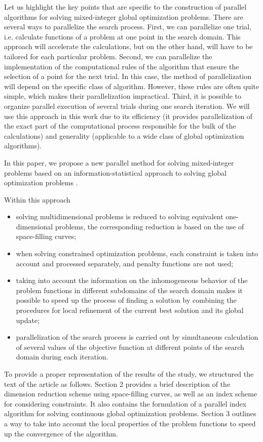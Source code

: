 \documentclass[
11pt,%
tightenlines,%
twoside,%
onecolumn,%
nofloats,%
nobibnotes,%
nofootinbib,%
superscriptaddress,%
noshowpacs,%
centertags]%
{revtex4}
\begin{document}
Let us highlight the key points that are specific to the construction of parallel algorithms for solving mixed-integer global optimization problems. There are several ways to parallelize the search process.
First, we can parallelize one trial, i.e. calculate functions of a problem at one point in the search domain. This approach will accelerate the calculations, but on the other hand, will have to be tailored for each particular problem.
Second, we can parallelize the implementation of the computational rules of the algorithm that ensure the selection of a point for the next trial. In this case, the method of parallelization will depend on the specific class of algorithm. However, these rules are often quite simple, which makes their parallelization impractical.
Third, it is possible to organize parallel execution of several trials during one search iteration. We will use this approach in this work due to its efficiency (it provides parallelization of the exact part of the computational process responsible for the bulk of the calculations) and generality (applicable to a wide class of global optimization algorithms).

In this paper, we propose a new parallel method for solving mixed-integer problems based on an information-statistical approach to solving global optimization problems \cite{Strongin2000,Strongin2013}. 

Within this approach 
\begin{itemize}
	\item 
	solving multidimensional problems is reduced to solving equivalent one-dimensional problems, the corresponding reduction is based on the use of space-filling curves;
	\item 
	when solving constrained optimization problems, each constraint is taken into account and processed separately, and penalty functions are not used;
	\item
	taking into account the information on the inhomogeneous behavior of the problem functions in different subdomains of the search domain makes it possible to speed up the process of finding a solution by combining the procedures for local refinement of the current best solution and its global update;
	\item 
	parallelization of the search process is carried out by simultaneous calculation of several values of the objective function at different points of the search domain during each iteration.	
\end{itemize}

To provide a proper representation of the results of the study, we structured the text of the article as follows.
Section 2 provides a brief description of the dimension reduction scheme using space-filling curves, as well as an index scheme for considering constraints. It also contains the formulation of a parallel index algorithm for solving continuous global optimization problems.
Section 3 outlines a way to take into account the local properties of the problem functions to speed up the convergence of the algorithm.
\end{document}
